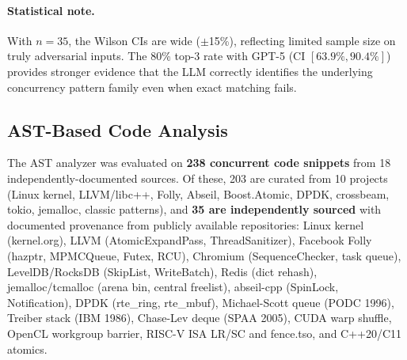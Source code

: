 \documentclass[11pt]{article}
\begin{document}
\paragraph{Statistical note.}
With $n=35$, the Wilson CIs are wide ($\pm$15\%), reflecting limited
sample size on truly adversarial inputs. The 80\% top-3 rate
with GPT-5 (CI $[63.9\%, 90.4\%]$) provides stronger evidence
that the LLM correctly identifies the underlying concurrency
pattern family even when exact matching fails.

\subsection{AST-Based Code Analysis}
\label{sec:code-analysis}

The AST analyzer was evaluated on \textbf{238 concurrent code
snippets} from 18 independently-documented sources.
Of these, 203 are curated from 10 projects
(Linux kernel, LLVM\slash libc++, Folly, Abseil,
Boost.Atomic, DPDK, crossbeam, tokio, jemalloc, classic patterns),
and \textbf{35 are independently sourced} with documented provenance from
publicly available repositories: Linux kernel (kernel.org),
LLVM (AtomicExpandPass, ThreadSanitizer), Facebook Folly
(hazptr, MPMCQueue, Futex, RCU), Chromium (SequenceChecker, task queue),
LevelDB/RocksDB (SkipList, WriteBatch), Redis (dict rehash),
jemalloc/tcmalloc (arena bin, central freelist),
abseil-cpp (SpinLock, Notification), DPDK (rte\_ring, rte\_mbuf),
Michael-Scott queue (PODC 1996), Treiber stack (IBM 1986),
Chase-Lev deque (SPAA 2005), CUDA warp shuffle, OpenCL workgroup barrier,
RISC-V ISA LR/SC and fence.tso, and C++20/C11 atomics.
\end{document}
